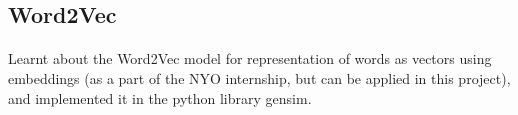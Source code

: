 \documentclass{report}
\begin{document}
        \subsection*{\fontsize{16}{20}\selectfont Word2Vec}
        	\vspace{+1mm}\paragraph{}{\fontsize{13}{16}\selectfont Learnt about the Word2Vec model for representation of words as vectors using embeddings (as a part of the NYO internship, but can be applied in this project), and implemented it in the python library gensim.}
        
    
\end{document}
